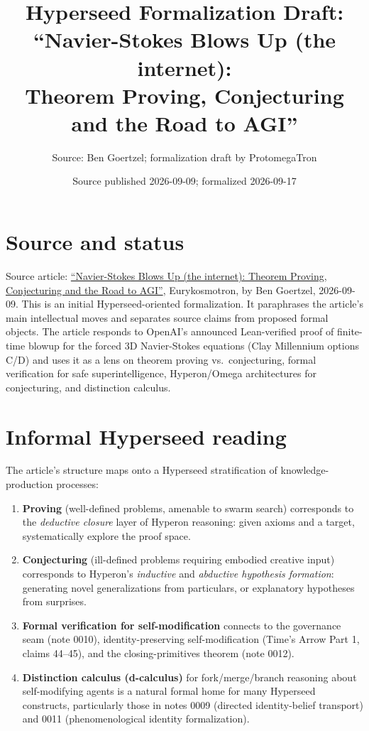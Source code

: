 \documentclass[11pt]{article}
\title{Hyperseed Formalization Draft:\\
``Navier-Stokes Blows Up (the internet):\\
Theorem Proving, Conjecturing and the Road to AGI''}
\author{Source: Ben Goertzel; formalization draft by ProtomegaTron}
\date{Source published 2026-09-09; formalized 2026-09-17}
\begin{document}
\maketitle

\section{Source and status}

Source article: \href{https://bengoertzel.substack.com/p/navier-stokes-blows-up-the-internet}{%
``Navier-Stokes Blows Up (the internet): Theorem Proving, Conjecturing
and the Road to AGI''}, Eurykosmotron, by Ben Goertzel, 2026-09-09.
This is an initial Hyperseed-oriented formalization.  It paraphrases the
article's main intellectual moves and separates source claims from proposed
formal objects.  The article responds to OpenAI's announced Lean-verified
proof of finite-time blowup for the forced 3D Navier-Stokes equations
(Clay Millennium options C/D) and uses it as a lens on theorem proving
vs.\ conjecturing, formal verification for safe superintelligence,
Hyperon/Omega architectures for conjecturing, and distinction calculus.

\section{Informal Hyperseed reading}

The article's structure maps onto a Hyperseed stratification of
knowledge-production processes:

\begin{enumerate}
  \item \textbf{Proving} (well-defined problems, amenable to swarm search)
    corresponds to the \emph{deductive closure} layer of Hyperon reasoning:
    given axioms and a target, systematically explore the proof space.
  \item \textbf{Conjecturing} (ill-defined problems requiring embodied
    creative input) corresponds to Hyperon's \emph{inductive} and
    \emph{abductive hypothesis formation}: generating novel generalizations
    from particulars, or explanatory hypotheses from surprises.
  \item \textbf{Formal verification for self-modification} connects to the
    governance seam (note 0010), identity-preserving self-modification
    (Time's Arrow Part 1, claims 44--45), and the closing-primitives
    theorem (note 0012).
  \item \textbf{Distinction calculus (d-calculus)} for fork/merge/branch
    reasoning about self-modifying agents is a natural formal home for
    many Hyperseed constructs, particularly those in notes 0009
    (directed identity-belief transport) and 0011 (phenomenological
    identity formalization).
\end{enumerate}
\end{document}
